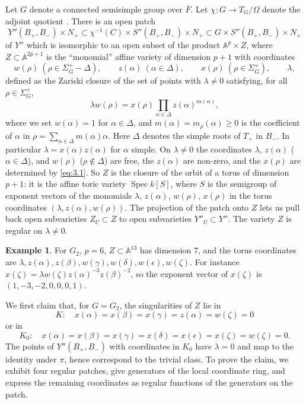 \documentclass[12pt,letterpaper]{amsart}
\theoremstyle{plain}
\theoremstyle{definition}
\theoremstyle{remark}
\theoremstyle{definition}
\newtheorem*{example}{Example}
\newcommand{\ovF}{\overline{F}}
\newcommand{\aaa}{\mathbb{A}}
\begin{document}
Let $G$ denote a connected semisimple group over $\ovF$.
Let $\chi:G\rightarrow T_G/\Omega$ denote the adjoint quotient \cite{Sl80}.
There is an open patch
\[
Y''(B_+,B_-)\times N_+\subset
\chi^{-1}(C)\times S''(B_+,B_-)\times N_+
\subset G\times S''(B_+,B_-)\times N_+
\]
of $Y''$ which is isomorphic to an open subset of the product
$\aaa^p\times Z$, where $Z\subset \aaa^{2p+1}$ is the
``monomial'' affine variety of dimension $p+1$ with coordinates
\[
w(\rho)\ (\rho\in \Sigma_G^+ -\Delta),\qquad
z(\alpha)\ (\alpha\in\Delta),\qquad x(\rho)
\ (\rho\in\Sigma_G^+),\qquad \lambda,
\]
defined as the Zariski closure of the set of points with $\lambda\neq0$
satisfying, for all $\rho\in\Sigma_G^+$,
\begin{equation}\tag{3.1}\label{eq:3.1}
\lambda w(\rho )=x(\rho)\prod_{\alpha\in\Delta }z(\alpha )^{m(\alpha)},
\end{equation}
where we set $w(\alpha)=1$ for $\alpha\in\Delta$, and $m(\alpha)=m_\rho(\alpha)\geq 0$ is the coefficient of $\alpha$ in
$\rho = \sum_{\alpha\in\Delta }m(\alpha)\alpha $.
Here $\Delta$ denotes the simple roots of $T_+$ in $B_-$.
In particular $\lambda =x(\alpha)z(\alpha)$ for $\alpha$ simple.
On $\lambda\neq0$ the coordinates $\lambda$, $z(\alpha)$ ($\alpha\in\Delta$),
and $w(\rho)$ ($\rho\notin\Delta$) are free, the $z(\alpha)$ are non-zero, and
the $x(\rho)$ are determined by \eqref{eq:3.1}. So $Z$ is the closure of the
orbit of a torus of dimension $p+1$: it is the affine toric variety
$\operatorname{Spec}k[S]$, where $S$ is the semigroup of exponent vectors of the
monomials $\lambda$, $z(\alpha)$, $w(\rho)$, $x(\rho)$ in the torus coordinates
$(\lambda,z(\alpha),w(\rho))$. The projection of the patch onto $Z$ lets us
pull back open subvarieties $Z_U\subset Z$ to open subvarieties
$Y''_U\subset Y''$. The variety $Z$ is regular on $\lambda\neq0$.

\begin{example}
For $G_2$, $p=6$, $Z\subset\aaa^{13}$ has dimension $7$, and the torus
coordinates are $\lambda,z(\alpha),z(\beta),w(\gamma),w(\delta),w(\epsilon),
w(\zeta)$. For instance $x(\zeta)=\lambda w(\zeta)z(\alpha)^{-3}z(\beta)^{-2}$,
so the exponent vector of $x(\zeta)$ is $(1,-3,-2,0,0,0,1)$.
\end{example}

We first claim that, for $G=G_2$,
the singularities of $Z$ lie in
\[
K:\quad x(\alpha)=x(\beta)=x(\gamma)=z(\alpha)=w(\zeta)=0
\]
or in
\[
K_0:\quad x(\alpha)=x(\beta)=x(\gamma)=x(\delta)=x(\epsilon)=x(\zeta)=w(\zeta)=0.
\]
The points of $Y''(B_+,B_-)$ with coordinates in $K_0$ have $\lambda=0$ and
map to the identity under $\pi$, hence correspond to the trivial class.
To prove the claim, we exhibit four regular patches, give generators of the
local coordinate ring, and express the remaining coordinates as regular
functions of the generators on the patch.
\end{document}
